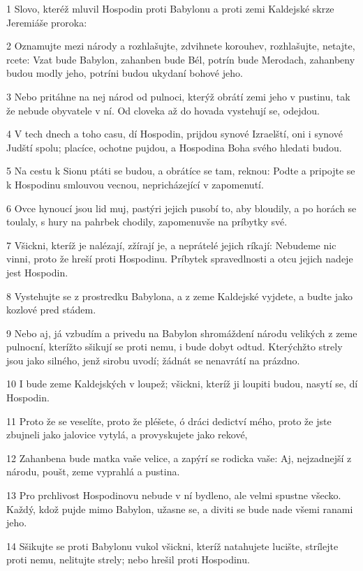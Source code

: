 \par 1 Slovo, kteréž mluvil Hospodin proti Babylonu a proti zemi Kaldejské skrze Jeremiáše proroka:
\par 2 Oznamujte mezi národy a rozhlašujte, zdvihnete korouhev, rozhlašujte, netajte, rcete: Vzat bude Babylon, zahanben bude Bél, potrín bude Merodach, zahanbeny budou modly jeho, potríni budou ukydaní bohové jeho.
\par 3 Nebo pritáhne na nej národ od pulnoci, kterýž obrátí zemi jeho v pustinu, tak že nebude obyvatele v ní. Od cloveka až do hovada vystehují se, odejdou.
\par 4 V tech dnech a toho casu, dí Hospodin, prijdou synové Izraelští, oni i synové Judští spolu; placíce, ochotne pujdou, a Hospodina Boha svého hledati budou.
\par 5 Na cestu k Sionu ptáti se budou, a obrátíce se tam, reknou: Podte a pripojte se k Hospodinu smlouvou vecnou, nepricházející v zapomenutí.
\par 6 Ovce hynoucí jsou lid muj, pastýri jejich pusobí to, aby bloudily, a po horách se toulaly, s hury na pahrbek chodily, zapomenuvše na príbytky své.
\par 7 Všickni, kteríž je nalézají, zžírají je, a neprátelé jejich ríkají: Nebudeme nic vinni, proto že hreší proti Hospodinu. Príbytek spravedlnosti a otcu jejich nadeje jest Hospodin.
\par 8 Vystehujte se z prostredku Babylona, a z zeme Kaldejské vyjdete, a budte jako kozlové pred stádem.
\par 9 Nebo aj, já vzbudím a privedu na Babylon shromáždení národu velikých z zeme pulnocní, kterížto sšikují se proti nemu, i bude dobyt odtud. Kterýchžto strely jsou jako silného, jenž sirobu uvodí; žádnát se nenavrátí na prázdno.
\par 10 I bude zeme Kaldejských v loupež; všickni, kteríž ji loupiti budou, nasytí se, dí Hospodin.
\par 11 Proto že se veselíte, proto že pléšete, ó dráci dedictví mého, proto že jste zbujneli jako jalovice vytylá, a provyskujete jako rekové,
\par 12 Zahanbena bude matka vaše velice, a zapýrí se rodicka vaše: Aj, nejzadnejší z národu, poušt, zeme vyprahlá a pustina.
\par 13 Pro prchlivost Hospodinovu nebude v ní bydleno, ale velmi spustne všecko. Každý, kdož pujde mimo Babylon, užasne se, a diviti se bude nade všemi ranami jeho.
\par 14 Sšikujte se proti Babylonu vukol všickni, kteríž natahujete lucište, strílejte proti nemu, nelitujte strely; nebo hrešil proti Hospodinu.
